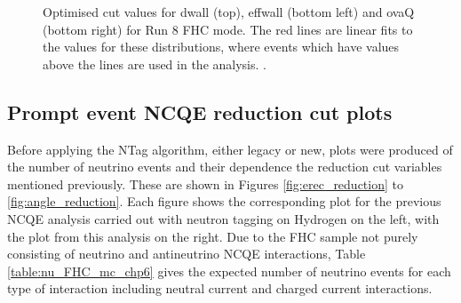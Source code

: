 \begin{figure}
\begin{minipage}{.5\linewidth}
    \end{minipage}\par\medskip
    \centering
    
    \caption{Optimised cut values for dwall (top), effwall (bottom left) and ovaQ (bottom right) for Run 8 FHC mode. The red lines are linear fits to the values for these distributions, where events which have values above the lines are used in the analysis. \cite{Abe_2019}.}
    \label{fig:optimised_dwall_effwall_ovaq}
\end{figure}
    


\subsection{Prompt event NCQE reduction cut plots}

Before applying the NTag algorithm, either legacy or new, plots were produced of the number of neutrino events and their dependence the reduction cut variables mentioned previously. These are shown in Figures \ref{fig:erec_reduction} to \ref{fig:angle_reduction}. Each figure shows the corresponding plot for the previous NCQE analysis carried out with neutron tagging on Hydrogen on the left, with the plot from this analysis on the right. Due to the FHC sample not purely consisting of neutrino and antineutrino NCQE interactions, Table \ref{table:nu_FHC_mc_chp6} gives the expected number of neutrino events for each type of interaction including neutral current and charged current interactions.

